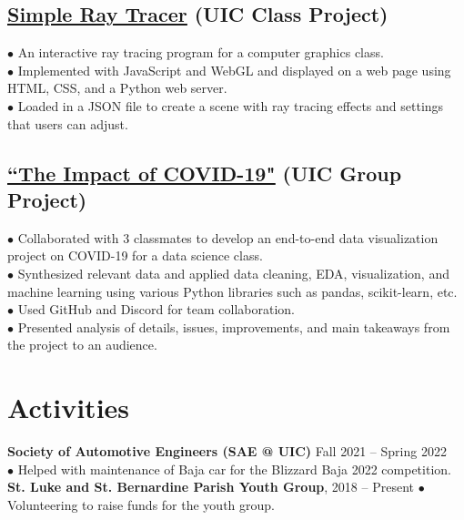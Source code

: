 \documentclass{article}
\begin{document}
\subsection{\href{https://github.com/IanLulu/simple-ray-tracer}{\underline{Simple Ray Tracer}} (UIC Class Project)} %
\vspace{-0.5em}
$\bullet$ An interactive ray tracing program for a computer graphics class.
\\
$\bullet$ Implemented with JavaScript and WebGL and displayed on a web page using HTML, CSS, and a Python web server.
\\
$\bullet$ Loaded in a JSON file to create a scene with ray tracing effects and settings that users can adjust.

\subsection{\href{https://github.com/uic-cs418/cs418-spring22-the-wild-card}{\underline{``The Impact of COVID-19"}} (UIC Group Project)}
\vspace{-0.5em}
$\bullet$ Collaborated with 3 classmates to develop an end-to-end data visualization project on COVID-19 for a data science class.
\\
$\bullet$ Synthesized relevant data and applied data cleaning, EDA, visualization, and machine learning using various Python libraries such as pandas, scikit-learn, etc.
\\
$\bullet$ Used GitHub and Discord for team collaboration.
\\
$\bullet$ Presented analysis of details, issues, improvements, and main takeaways from the project to an audience.


\section{Activities}
\textbf{Society of Automotive Engineers (SAE @ UIC)} \hfill Fall 2021 -- Spring 2022
\\
$\bullet$ Helped with maintenance of Baja car for the Blizzard Baja 2022 competition.
\\
\textbf{St. Luke and St. Bernardine Parish Youth Group}, 2018 -- Present $\bullet$ Volunteering to raise funds for the youth group.
\end{document}
